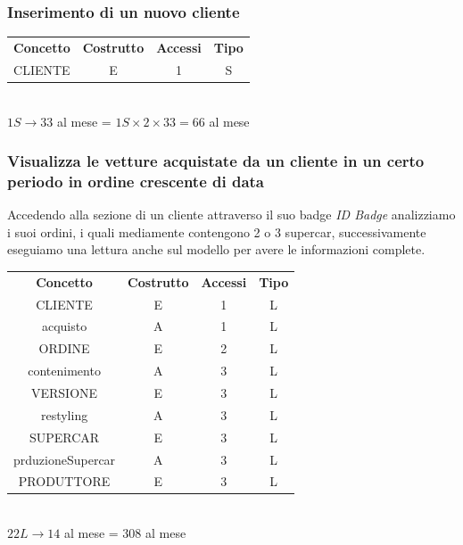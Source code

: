 \documentclass[11pt]{article}
\begin{document}
\subsubsection{Inserimento di un nuovo cliente}

\begin{table}[H]
    \centering
    \begin{tabular}{ c c c c }
        \rowcolor{red!20!}
        \textbf{Concetto} & \textbf{Costrutto} & \textbf{Accessi} &
        \textbf{Tipo}\\
        CLIENTE & E & 1 & S \\
    \end{tabular}\\
    \( 1S \rightarrow 33 \) al mese = \( 1S \times 2 \times 33 = 66 \) al mese
\end{table}


\subsubsection{Visualizza le vetture acquistate da un cliente in un certo periodo in
ordine crescente di data}

Accedendo alla sezione di un cliente attraverso il suo badge \textit{ID Badge}
analizziamo i suoi ordini, i quali mediamente contengono 2 o 3 supercar,
successivamente eseguiamo una lettura anche sul modello per avere le
informazioni complete.

\begin{table}[H]
    \centering
    \begin{tabular}{ c c c c }
        \rowcolor{red!20!}
        \textbf{Concetto} & \textbf{Costrutto}  & \textbf{Accessi} &
        \textbf{Tipo}\\ 
        CLIENTE & E & 1 & L \\
        acquisto & A & 1 & L \\ 
        ORDINE & E & 2 & L \\ 
        contenimento & A & 3 & L \\
        VERSIONE & E & 3 & L \\ 
        restyling & A & 3 & L \\
        SUPERCAR & E & 3 & L \\
        prduzioneSupercar & A & 3 & L \\
        PRODUTTORE & E & 3 & L \\
    \end{tabular}\\
        \( 22L  \rightarrow 14 \) al mese = \( 308 \) al mese
\end{table}
\end{document}
